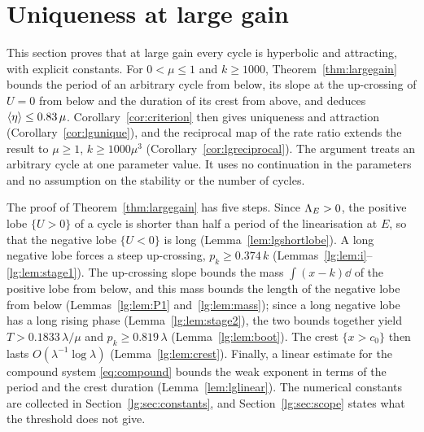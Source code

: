 \section{Uniqueness at large gain}\label{sec:largegain}
This section proves that at large gain every cycle is hyperbolic and attracting, with explicit constants. For $0<\mu\le1$ and $k\ge1000$, Theorem~\ref{thm:largegain} bounds the period of an arbitrary cycle from below, its slope at the up-crossing of $U=0$ from below and the duration of its crest from above, and deduces $\left\langle \eta\right\rangle\le0.83\,\mu$. Corollary~\ref{cor:criterion} then gives uniqueness and attraction (Corollary~\ref{cor:lgunique}), and the reciprocal map of the rate ratio extends the result to $\mu\ge1$, $k\ge1000\mu^3$ (Corollary~\ref{cor:lgreciprocal}). The argument treats an arbitrary cycle at one parameter value. It uses no continuation in the parameters and no assumption on the stability or the number of cycles.

The proof of Theorem~\ref{thm:largegain} has five steps. Since $\Lambda_E>0$, the positive lobe $\{U>0\}$ of a cycle is shorter than half a period of the linearisation at $E$, so that the negative lobe $\{U<0\}$ is long (Lemma~\ref{lem:lgshortlobe}). A long negative lobe forces a steep up-crossing, $p_k\ge0.374\,k$ (Lemmas~\ref{lg:lem:i}--\ref{lg:lem:stage1}). The up-crossing slope bounds the mass $\int(x-k)\dd$ of the positive lobe from below, and this mass bounds the length of the negative lobe from below (Lemmas~\ref{lg:lem:P1} and~\ref{lg:lem:mass}); since a long negative lobe has a long rising phase (Lemma~\ref{lg:lem:stage2}), the two bounds together yield $T>0.1833\,\lambda/\mu$ and $p_k\ge0.819\,\lambda$ (Lemma~\ref{lg:lem:boot}). The crest $\{x>c_0\}$ then lasts $O(\lambda^{-1}\log\lambda)$ (Lemma~\ref{lg:lem:crest}). Finally, a linear estimate for the compound system \eqref{eq:compound} bounds the weak exponent in terms of the period and the crest duration (Lemma~\ref{lem:lglinear}). The numerical constants are collected in Section~\ref{lg:sec:constants}, and Section~\ref{lg:sec:scope} states what the threshold does not give.

